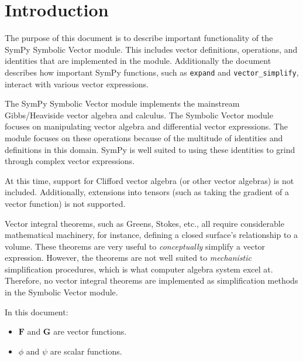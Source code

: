 \documentclass[12pt, titlepage]{article}
\newcommand{\code}[1]{\texttt{#1}}
\begin{document}
	
	\section{Introduction}
	The purpose of this document is to describe important functionality of the SymPy Symbolic Vector module.  This includes vector definitions, operations, and identities that are implemented in the module. Additionally the document describes how important SymPy functions, such as \code{expand} and \code{vector\_simplify}, interact with various vector expressions.  %
	
	The SymPy Symbolic Vector module implements the mainstream Gibbs/Heaviside vector algebra and calculus.  The Symbolic Vector module focuses on manipulating vector algebra and differential vector expressions.  The module focuses on these operations because of the multitude of identities and definitions in this domain.  SymPy is well suited to using these identities to grind through complex vector expressions.
	
	At this time, support for Clifford vector algebra (or other vector algebras) is not included.  Additionally, extensions into tensors (such as taking the gradient of a vector function) is not supported.  
	
	Vector integral theorems, such as Greens, Stokes, etc., all require considerable mathematical machinery, for instance, defining a closed surface's relationship to a volume. These theorems are very useful to \emph{conceptually} simplify a vector expression. However, the theorems are not well suited to \emph{mechanistic} simplification procedures, which is what computer algebra system excel at.  Therefore, no vector integral theorems are implemented as simplification methods in the Symbolic Vector module.
	
	In this document:
	\begin{itemize}
		
		
		\item \( \mathbf{F}\) and \(\mathbf{G}\) are vector functions.  
		
		\item \(\phi\) and \(\psi\) are scalar functions.
	\end{itemize}
\end{document}
